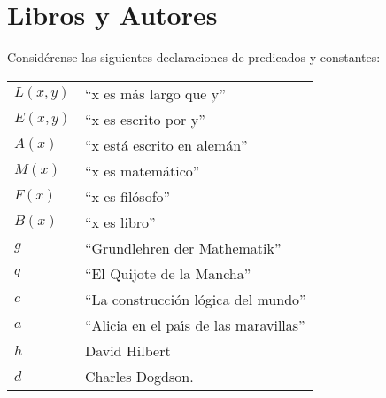 \documentclass[11pt,letterpaper]{article}
\begin{document}
\section{Libros y Autores}
Considérense las siguientes declaraciones de predicados y constantes: \\
\begin{tabular}{ll}
 $L(x,y)$  & \enquote{x es m\'as largo que y} \\
 $E(x,y)$ & \enquote{x es escrito por y}\\
 $A(x)$  &  \enquote{x est\'a escrito en alem\'an}\\
 $M(x)$ & \enquote{x es matem\'atico}\\
 $F(x)$ & \enquote{x es fil\'osofo}\\
 $B(x)$ & \enquote{x es libro}\\
 $g$ & \enquote{Grund\-leh\-ren der Mathematik}\\
 $q$ & \enquote{El Quijote de la Mancha}\\
 $c$ & \enquote{La construcci\'on l\'ogica del mundo}\\
 $a$ & \enquote{Alicia en el pa\'{\i}s de las maravillas}\\
 $h$ & David Hilbert \\
 $d$ & Charles Dogdson.
\end{tabular}\\
\end{document}
